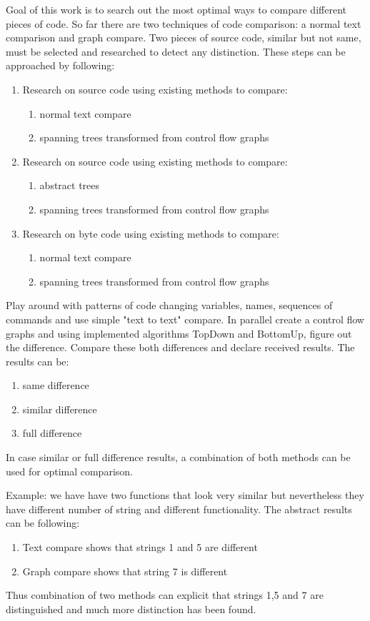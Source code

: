Goal of this work is to search out the most optimal ways to compare different pieces of code. So far there are two techniques of code comparison: a normal text comparison and graph compare. 
Two pieces of source code, similar but not same, must be selected and researched to detect any distinction. These steps can be approached by following:

\begin{enumerate}
  \item Research on source code using existing methods to compare:
  	\begin{enumerate}
   	 	\item normal text compare
   		 \item spanning trees transformed from control flow graphs
	 \end{enumerate}	
  \item Research on source code using existing methods to compare:
  \begin{enumerate}
    \item abstract trees
    \item spanning trees transformed from control flow graphs
  \end{enumerate}
  \item Research on byte code using existing methods to compare:
  \begin{enumerate}
    \item normal text compare
    \item spanning trees transformed from control flow graphs
  \end{enumerate}
\end{enumerate}

	
Play around with patterns of code changing variables, names, sequences of commands and use simple "text to text" compare. In parallel create a control flow graphs and using implemented algorithms TopDown and BottomUp, figure out the difference. Compare these both differences and declare received results.
The results can be: 
\begin{enumerate}
  \item same difference
  \item similar difference
  \item full difference
\end{enumerate}
In case similar or full difference results, a combination of both methods can be used for optimal comparison. 

Example: we have have two functions that look very similar but nevertheless they have different number of string and different functionality. The abstract results can be following:
\begin{enumerate}
	\item Text compare shows that strings 1 and 5 are different
	\item Graph compare shows that string 7 is different 
\end{enumerate}

Thus combination of two methods can explicit that strings 1,5 and 7 are distinguished and much more distinction has been found.
